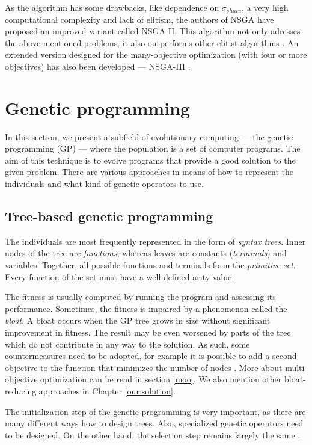 \label{nsgaii}
As the algorithm has some drawbacks, like dependence on $\sigma_{share}$,
a very high computational complexity and lack of elitism, the authors of
NSGA have proposed an improved variant called NSGA-II. This algorithm not only
adresses the above-mentioned problems, it also outperforms other elitist
algorithms \citep{Deb:2002:FEM:2221359.2221582}. An extended version designed
for the many-objective optimization (with four or more objectives) has also
been developed --- NSGA-III \citep{6600851}.

\section{Genetic programming} \label{sec:gp}
In this section, we present a subfield of evolutionary computing --- 
the genetic programming (GP) --- where the population is a set of computer 
programs. The aim of this technique is to evolve programs that provide 
a good solution to the given problem. There are various approaches in means 
of how to represent the individuals and what kind of genetic operators to 
use.

\subsection{Tree-based genetic programming} \label{gp:treebased}
The individuals are most frequently represented in the form of 
\emph{syntax trees}. Inner nodes of the tree are \emph{functions}, whereas 
leaves  are constants (\emph{terminals}) and variables. Together, all possible
functions and terminals form the \emph{primitive set}. Every function of the
set must have a well-defined arity value.

The fitness is usually computed by running the program and assessing its
performance. Sometimes, the fitness is impaired by a phenomenon called the
\emph{bloat}. A bloat occurs when the GP tree grows in size without significant
improvement in fitness. The result may be even worsened by parts of the tree which
do not contribute in any way to the solution. As such, some countermeasures need
to be adopted, for example it is possible to add a second objective to the function
that minimizes the number of nodes \citep[p.~24--26]{Poli:2008:FGG:1796422}.
More about multi-objective optimization can be
read in section \ref{moo}. We also mention other bloat-reducing approaches 
in Chapter \ref{our:solution}.

The initialization step of the genetic programming is very important, as
there are many different ways how to design trees. Also, specialized genetic
operators need to be designed. On the other hand, the selection step remains
largely the same \citep{Poli:2008:FGG:1796422}.

